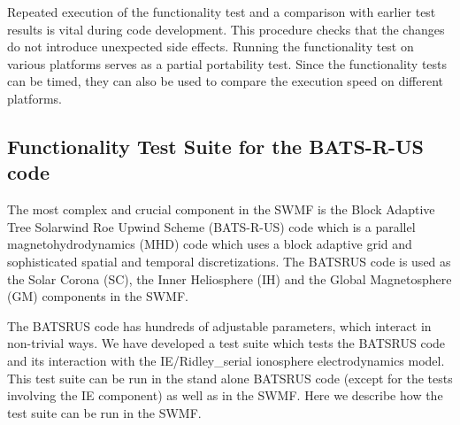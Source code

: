 \documentclass[twoside,10pt]{article}
\begin{document}
Repeated execution of the functionality test and a
comparison with earlier test results is vital during code development.
This procedure checks that the changes do not introduce unexpected side 
effects. Running the functionality test on various
platforms serves as a partial portability test. Since the 
functionality tests can be timed, they can also be used to compare
the execution speed on different platforms.

\subsection{Functionality Test Suite for the BATS-R-US code}

The most complex and crucial component in the SWMF is the 
Block Adaptive Tree Solarwind Roe Upwind Scheme (BATS-R-US) code
which is a parallel magnetohydrodynamics (MHD) code which uses a
block adaptive grid and sophisticated spatial and temporal discretizations.
The BATSRUS code is used as the Solar Corona (SC), the Inner Heliosphere (IH)
and the Global Magnetosphere (GM) components in the SWMF.

The BATSRUS code has hundreds of adjustable parameters, which interact
in non-trivial ways. We have developed a test suite
which tests the BATSRUS code and its interaction with the IE/Ridley\_serial
ionosphere electrodynamics model. This test suite can be run in
the stand alone BATSRUS code (except for the tests involving the
IE component) as well as in the SWMF. Here we describe how the
test suite can be run in the SWMF.
\end{document}
